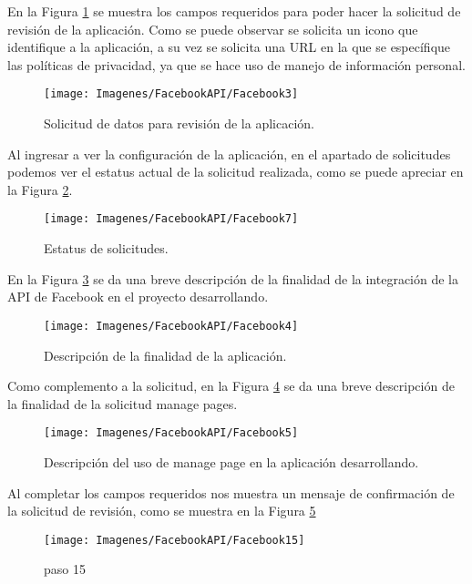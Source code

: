 	\noindent En la Figura \ref{creacionFB3} se muestra los campos requeridos para poder hacer la solicitud de revisión de la aplicación. Como se puede observar se solicita un icono que identifique a la aplicación, a su vez se solicita una URL en la que se específique las políticas de privacidad, ya que se hace uso de manejo de información personal.
\pagebreak
	\begin{figure}[hbt!]
		\centering
		\texttt{[image: Imagenes/FacebookAPI/Facebook3]}
		\caption{Solicitud de datos para revisión de la aplicación.}
		\label{creacionFB3}
	\end{figure}

	\noindent Al ingresar a ver la configuración de la aplicación, en el apartado de solicitudes podemos ver el estatus actual de la solicitud realizada, como se puede apreciar en la Figura \ref{creacionFB7}.

	\begin{figure}[hbt!]
		\centering
		\texttt{[image: Imagenes/FacebookAPI/Facebook7]}
		\caption{Estatus de solicitudes.}
		\label{creacionFB7}
	\end{figure}
	
	\noindent En la Figura \ref{creacionFB4} se da una breve descripción de la finalidad de la integración de la API de Facebook en el proyecto desarrollando.
\pagebreak
	\begin{figure}[hbt!]
		\centering
		\texttt{[image: Imagenes/FacebookAPI/Facebook4]}
		\caption{Descripción de la finalidad de la aplicación.}
		\label{creacionFB4}
	\end{figure}

	\noindent Como complemento a la solicitud, en la Figura \ref{creacionFB5} se da una breve descripción de la finalidad de la solicitud manage pages.

	\begin{figure}[hbt!]
		\centering
		\texttt{[image: Imagenes/FacebookAPI/Facebook5]}
		\caption{Descripción del uso de manage page en la aplicación desarrollando.}
		\label{creacionFB5}
	\end{figure}

	\noindent Al completar los campos requeridos nos muestra un mensaje de confirmación de la solicitud de revisión, como se muestra en la Figura \ref{creacionFB15}
\pagebreak
	\begin{figure}[hbt!]
		\centering
		\texttt{[image: Imagenes/FacebookAPI/Facebook15]}
		\caption{paso 15}
		\label{creacionFB15}
	\end{figure}


